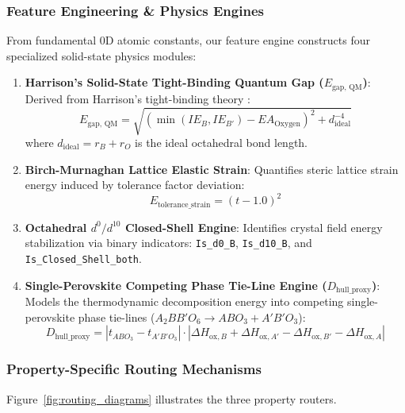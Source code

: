 \documentclass[journal=jcisd8,manuscript=article]{achemso}
\begin{document}
\subsubsection{Feature Engineering \& Physics Engines}
From fundamental 0D atomic constants, our feature engine constructs four specialized solid-state physics modules:
\begin{enumerate}
\item \textbf{Harrison's Solid-State Tight-Binding Quantum Gap ($E_{\text{gap, QM}}$)}: Derived from Harrison's tight-binding theory \cite{harrison1999elementary}:
   \begin{equation}
   E_{\text{gap, QM}} = \sqrt{\left(\min(IE_B, IE_{B'}) - EA_{\text{Oxygen}}\right)^2 + d_{\text{ideal}}^{-4}}
   \end{equation}
   where $d_{\text{ideal}} = r_B + r_O$ is the ideal octahedral bond length.

\item \textbf{Birch-Murnaghan Lattice Elastic Strain}: Quantifies steric lattice strain energy induced by tolerance factor deviation:
   \begin{equation}
   E_{\text{tolerance\_strain}} = (t - 1.0)^2
   \end{equation}

\item \textbf{Octahedral $d^0/d^{10}$ Closed-Shell Engine}: Identifies crystal field energy stabilization via binary indicators: \texttt{Is\_d0\_B}, \texttt{Is\_d10\_B}, and \texttt{Is\_Closed\_Shell\_both}.

\item \textbf{Single-Perovskite Competing Phase Tie-Line Engine ($D_{\text{hull\_proxy}}$)}: Models the thermodynamic decomposition energy into competing single-perovskite phase tie-lines ($A_2BB'O_6 \rightarrow ABO_3 + A'B'O_3$):
   \begin{equation}
   D_{\text{hull\_proxy}} = |t_{ABO_3} - t_{A'B'O_3}| \cdot \left|\Delta H_{\text{ox}, B} + \Delta H_{\text{ox}, A'} - \Delta H_{\text{ox}, B'} - \Delta H_{\text{ox}, A}\right|
   \end{equation}
\end{enumerate}

\subsubsection{Property-Specific Routing Mechanisms}

Figure~\ref{fig:routing_diagrams} illustrates the three property routers.
\end{document}
